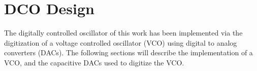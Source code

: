 






\FloatBarrier\pagebreak
\section{DCO Design}\label{sec:dco_design}
The digitally controlled oscillator of this work has been implemented via the digitization of a voltage controlled oscillator (VCO) using digital to analog converters (DACs).  The following sections will describe the implementation of a VCO, and the capacitive DACs used to digitize the VCO. 

